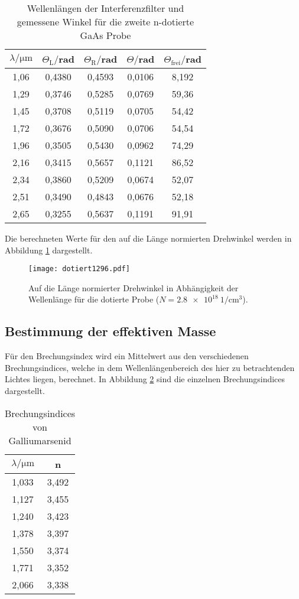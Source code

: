 \begin{table}[H]
  \centering
  \caption{Wellenlängen der Interferenzfilter und gemessene Winkel für die zweite n-dotierte GaAs Probe}
  \label{tab:zweite}
  \begin{tabular}{c c c c c}
    \toprule
    $\lambda/\mathrm{\mu m}$ & $\Theta_{\mathrm{L}}/$rad & $\Theta_{\mathrm{R}}/$rad  & $\Theta /$rad & $\Theta_{\mathrm{frei}}/$rad\\
    \midrule
    1,06  & 0,4380 & 0,4593 & 0,0106 & 8,192 \\
    1,29  & 0,3746 & 0,5285 & 0,0769 & 59,36 \\
    1,45  & 0,3708 & 0,5119 & 0,0705 & 54,42 \\
    1,72  & 0,3676 & 0,5090 & 0,0706 & 54,54 \\
    1,96  & 0,3505 & 0,5430 & 0,0962 & 74,29 \\
    2,16  & 0,3415 & 0,5657 & 0,1121 & 86,52 \\
    2,34  & 0,3860 & 0,5209 & 0,0674 & 52,07 \\
    2,51  & 0,3490 & 0,4843 & 0,0676 & 52,18 \\
    2,65  & 0,3255 & 0,5637 & 0,1191 & 91,91 \\
    \bottomrule
  \end{tabular}
\end{table}


Die berechneten Werte für den auf die Länge normierten Drehwinkel werden
in Abbildung \ref{fig:rein} dargestellt.
\begin{figure}[H]
  \centering
  \texttt{[image: dotiert1296.pdf]}
  \caption{Auf die Länge normierter Drehwinkel in Abhängigkeit der Wellenlänge für die dotierte Probe ($N = \SI{2.8e18}{1\per\centi\meter^3}$).}
  \label{fig:rein}
\end{figure}


\subsection{Bestimmung der effektiven Masse}
Für den Brechungsindex wird ein Mittelwert aus den verschiedenen Brechungsindices,
welche in dem Wellenlängenbereich des hier zu betrachtenden Lichtes liegen, berechnet. In Abbildung \ref{tab:Brechung}
sind die einzelnen Brechungsindices dargestellt.

\begin{table}[H]
  \centering
  \caption{Brechungsindices von Galliumarsenid}
  \label{tab:Brechung}
  \begin{tabular}{c c}
    \toprule
    $\lambda/\mathrm{\mu m}$ & n\\
    \midrule
    1,033  & 3,492 \\
    1,127  & 3,455 \\
    1,240  & 3,423 \\
    1,378  & 3,397 \\
    1,550  & 3,374 \\
    1,771  & 3,352 \\
    2,066  & 3,338 \\
    \bottomrule
  \end{tabular}
\end{table}

